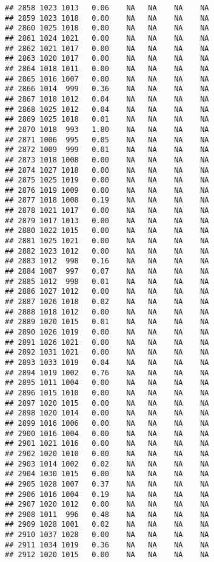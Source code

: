 \documentclass{article}\usepackage{graphicx, color}
\makeatletter
\newenvironment{kframe}{%
 \def\at@end@of@kframe{}%
 \ifinner\ifhmode%
  \def\at@end@of@kframe{\end{minipage}}%
  \begin{minipage}{\columnwidth}%
 \fi\fi%
 \def\FrameCommand##1{\hskip\@totalleftmargin \hskip-\fboxsep
 \colorbox{shadecolor}{##1}\hskip-\fboxsep
     \hskip-\linewidth \hskip-\@totalleftmargin \hskip\columnwidth}%
 \MakeFramed {\advance\hsize-\width
   \@totalleftmargin\z@ \linewidth\hsize
   \@setminipage}}%
 {\par\unskip\endMakeFramed%
 \at@end@of@kframe}
\newenvironment{knitrout}{}{} %
\makeatother
\begin{document}
\begin{knitrout}
\begin{kframe}
\begin{verbatim}
## 2858 1023 1013   0.06    NA   NA    NA    NA
## 2859 1023 1018   0.00    NA   NA    NA    NA
## 2860 1025 1018   0.00    NA   NA    NA    NA
## 2861 1024 1021   0.00    NA   NA    NA    NA
## 2862 1021 1017   0.00    NA   NA    NA    NA
## 2863 1020 1017   0.00    NA   NA    NA    NA
## 2864 1018 1011   0.00    NA   NA    NA    NA
## 2865 1016 1007   0.00    NA   NA    NA    NA
## 2866 1014  999   0.36    NA   NA    NA    NA
## 2867 1018 1012   0.04    NA   NA    NA    NA
## 2868 1025 1012   0.04    NA   NA    NA    NA
## 2869 1025 1018   0.01    NA   NA    NA    NA
## 2870 1018  993   1.80    NA   NA    NA    NA
## 2871 1006  995   0.05    NA   NA    NA    NA
## 2872 1009  999   0.01    NA   NA    NA    NA
## 2873 1018 1008   0.00    NA   NA    NA    NA
## 2874 1027 1018   0.00    NA   NA    NA    NA
## 2875 1025 1019   0.00    NA   NA    NA    NA
## 2876 1019 1009   0.00    NA   NA    NA    NA
## 2877 1018 1008   0.19    NA   NA    NA    NA
## 2878 1021 1017   0.00    NA   NA    NA    NA
## 2879 1017 1013   0.00    NA   NA    NA    NA
## 2880 1022 1015   0.00    NA   NA    NA    NA
## 2881 1025 1021   0.00    NA   NA    NA    NA
## 2882 1023 1012   0.00    NA   NA    NA    NA
## 2883 1012  998   0.16    NA   NA    NA    NA
## 2884 1007  997   0.07    NA   NA    NA    NA
## 2885 1012  998   0.01    NA   NA    NA    NA
## 2886 1027 1012   0.00    NA   NA    NA    NA
## 2887 1026 1018   0.02    NA   NA    NA    NA
## 2888 1018 1012   0.00    NA   NA    NA    NA
## 2889 1020 1015   0.01    NA   NA    NA    NA
## 2890 1026 1019   0.00    NA   NA    NA    NA
## 2891 1026 1021   0.00    NA   NA    NA    NA
## 2892 1031 1021   0.00    NA   NA    NA    NA
## 2893 1033 1019   0.04    NA   NA    NA    NA
## 2894 1019 1002   0.76    NA   NA    NA    NA
## 2895 1011 1004   0.00    NA   NA    NA    NA
## 2896 1015 1010   0.00    NA   NA    NA    NA
## 2897 1020 1015   0.00    NA   NA    NA    NA
## 2898 1020 1014   0.00    NA   NA    NA    NA
## 2899 1016 1006   0.00    NA   NA    NA    NA
## 2900 1016 1004   0.00    NA   NA    NA    NA
## 2901 1021 1016   0.00    NA   NA    NA    NA
## 2902 1020 1010   0.00    NA   NA    NA    NA
## 2903 1014 1002   0.02    NA   NA    NA    NA
## 2904 1030 1015   0.00    NA   NA    NA    NA
## 2905 1028 1007   0.37    NA   NA    NA    NA
## 2906 1016 1004   0.19    NA   NA    NA    NA
## 2907 1020 1012   0.00    NA   NA    NA    NA
## 2908 1011  996   0.48    NA   NA    NA    NA
## 2909 1028 1001   0.02    NA   NA    NA    NA
## 2910 1037 1028   0.00    NA   NA    NA    NA
## 2911 1034 1019   0.36    NA   NA    NA    NA
## 2912 1020 1015   0.00    NA   NA    NA    NA

\end{verbatim}
\end{kframe}
\end{knitrout}
\end{document}
